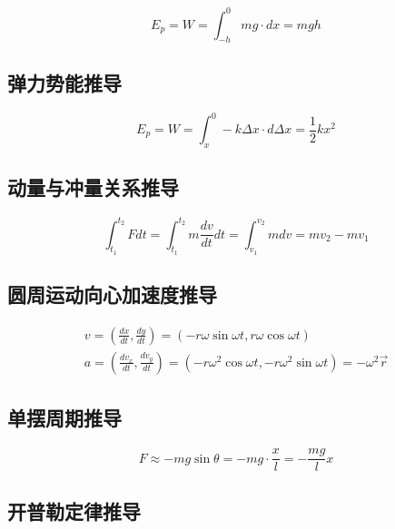 \begin{equation*}
    E_p=W=\int_{-h}^0mg\cdot dx=mgh
\end{equation*}

\subsection{弹力势能推导}

\begin{equation*}
    E_p=W=\int_{x}^0-k\Delta x\cdot d\Delta x=\frac12kx^2
\end{equation*}

\subsection{动量与冲量关系推导}

\begin{equation*}
    \int_{t_1}^{t_2}Fdt
    =\int_{t_1}^{t_2}m\frac{dv}{dt}dt
    =\int_{v_1}^{v_2}mdv
    =mv_2-mv_1
\end{equation*}

\subsection{圆周运动向心加速度推导}

\begin{gather*}
    v=\left(\frac{dx}{dt},\frac{dy}{dt}\right)
    =(-r\omega\sin\omega t,r\omega\cos\omega t)\\
    a=\left(\frac{dv_x}{dt},\frac{dv_y}{dt}\right)
    =(-r\omega^2\cos\omega t,-r\omega^2\sin\omega t)
    =-\omega^2\vec{r}
\end{gather*}

\subsection{单摆周期推导}

\begin{equation*}
    F\approx -mg\sin\theta=-mg\cdot\frac{x}{l}=-\frac{mg}{l}x
\end{equation*}

\subsection{开普勒定律推导}

